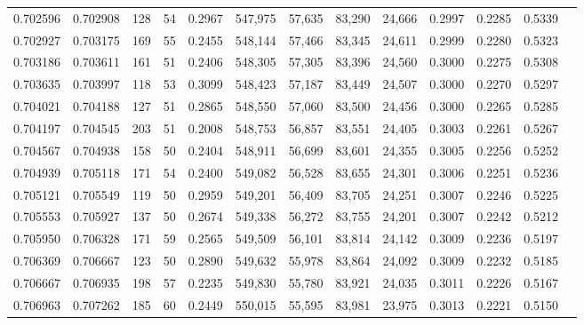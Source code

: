 \begin{tabular}{rrrrrrrrrrrrr}
0.702596 & 0.702908 &    128 &    54 &                                     0.2967 & 547,975 &  57,635 &  83,290 &  24,666 & 0.2997 & 0.2285 & 0.5339 \\
0.702927 & 0.703175 &    169 &    55 &                                     0.2455 & 548,144 &  57,466 &  83,345 &  24,611 & 0.2999 & 0.2280 & 0.5323 \\
0.703186 & 0.703611 &    161 &    51 &                                     0.2406 & 548,305 &  57,305 &  83,396 &  24,560 & 0.3000 & 0.2275 & 0.5308 \\
0.703635 & 0.703997 &    118 &    53 &                                     0.3099 & 548,423 &  57,187 &  83,449 &  24,507 & 0.3000 & 0.2270 & 0.5297 \\
0.704021 & 0.704188 &    127 &    51 &                                     0.2865 & 548,550 &  57,060 &  83,500 &  24,456 & 0.3000 & 0.2265 & 0.5285 \\
0.704197 & 0.704545 &    203 &    51 &                                     0.2008 & 548,753 &  56,857 &  83,551 &  24,405 & 0.3003 & 0.2261 & 0.5267 \\
0.704567 & 0.704938 &    158 &    50 &                                     0.2404 & 548,911 &  56,699 &  83,601 &  24,355 & 0.3005 & 0.2256 & 0.5252 \\
0.704939 & 0.705118 &    171 &    54 &                                     0.2400 & 549,082 &  56,528 &  83,655 &  24,301 & 0.3006 & 0.2251 & 0.5236 \\
0.705121 & 0.705549 &    119 &    50 &                                     0.2959 & 549,201 &  56,409 &  83,705 &  24,251 & 0.3007 & 0.2246 & 0.5225 \\
0.705553 & 0.705927 &    137 &    50 &                                     0.2674 & 549,338 &  56,272 &  83,755 &  24,201 & 0.3007 & 0.2242 & 0.5212 \\
0.705950 & 0.706328 &    171 &    59 &                                     0.2565 & 549,509 &  56,101 &  83,814 &  24,142 & 0.3009 & 0.2236 & 0.5197 \\
0.706369 & 0.706667 &    123 &    50 &                                     0.2890 & 549,632 &  55,978 &  83,864 &  24,092 & 0.3009 & 0.2232 & 0.5185 \\
0.706667 & 0.706935 &    198 &    57 &                                     0.2235 & 549,830 &  55,780 &  83,921 &  24,035 & 0.3011 & 0.2226 & 0.5167 \\
0.706963 & 0.707262 &    185 &    60 &                                     0.2449 & 550,015 &  55,595 &  83,981 &  23,975 & 0.3013 & 0.2221 & 0.5150 \\

\end{tabular}
